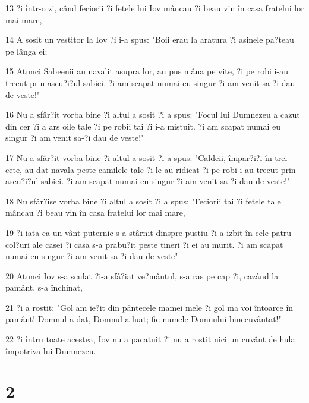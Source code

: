 \par 13 ?i într-o zi, când feciorii ?i fetele lui Iov mâncau ?i beau vin în casa fratelui lor mai mare,
\par 14 A sosit un vestitor la Iov ?i i-a spus: "Boii erau la aratura ?i asinele pa?teau pe lânga ei;
\par 15 Atunci Sabeenii au navalit asupra lor, au pus mâna pe vite, ?i pe robi i-au trecut prin ascu?i?ul sabiei. ?i am scapat numai eu singur ?i am venit sa-?i dau de veste!"
\par 16 Nu a sfâr?it vorba bine ?i altul a sosit ?i a spus: "Focul lui Dumnezeu a cazut din cer ?i a ars oile tale ?i pe robii tai ?i i-a mistuit. ?i am scapat numai eu singur ?i am venit sa-?i dau de veste!"
\par 17 Nu a sfâr?it vorba bine ?i altul a sosit ?i a spus: "Caldeii, împar?i?i în trei cete, au dat navala peste camilele tale ?i le-au ridicat ?i pe robi i-au trecut prin ascu?i?ul sabiei. ?i am scapat numai eu singur ?i am venit sa-?i dau de veste!"
\par 18 Nu sfâr?ise vorba bine ?i altul a sosit ?i a spus: "Feciorii tai ?i fetele tale mâncau ?i beau vin în casa fratelui lor mai mare,
\par 19 ?i iata ca un vânt puternic s-a stârnit dinspre pustiu ?i a izbit în cele patru col?uri ale casei ?i casa s-a prabu?it peste tineri ?i ei au murit. ?i am scapat numai eu singur ?i am venit sa-?i dau de veste".
\par 20 Atunci Iov s-a sculat ?i-a sfâ?iat ve?mântul, s-a ras pe cap ?i, cazând la pamânt, s-a închinat,
\par 21 ?i a rostit: "Gol am ie?it din pântecele mamei mele ?i gol ma voi întoarce în pamânt! Domnul a dat, Domnul a luat; fie numele Domnului binecuvântat!"
\par 22 ?i întru toate acestea, Iov nu a pacatuit ?i nu a rostit nici un cuvânt de hula împotriva lui Dumnezeu.

\chapter{2}

